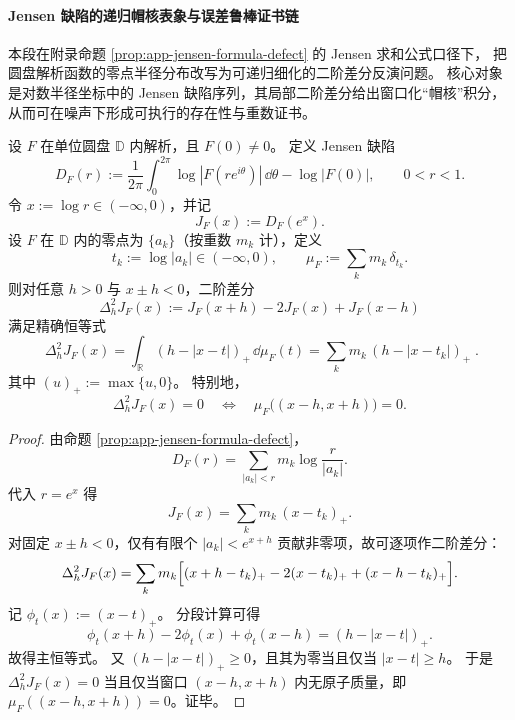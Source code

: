 \paragraph{Jensen 缺陷的递归帽核表象与误差鲁棒证书链}
本段在附录命题 \ref{prop:app-jensen-formula-defect} 的 Jensen 求和公式口径下，
把圆盘解析函数的零点半径分布改写为可递归细化的二阶差分反演问题。
核心对象是对数半径坐标中的 Jensen 缺陷序列，其局部二阶差分给出窗口化“帽核”积分，从而可在噪声下形成可执行的存在性与重数证书。

\begin{theorem}\label{thm:xi-jensen-defect-hat-kernel-second-difference}
设 \(F\) 在单位圆盘 \(\mathbb D\) 内解析，且 \(F(0)\neq 0\)。
定义 Jensen 缺陷
\[
D_F(r):=\frac{1}{2\pi}\int_0^{2\pi}\log|F(re^{i\theta})|\,\dd\theta-\log|F(0)|,
\qquad 0<r<1.
\]
令 \(x:=\log r\in(-\infty,0)\)，并记
\[
J_F(x):=D_F(e^x).
\]
设 \(F\) 在 \(\mathbb D\) 内的零点为 \(\{a_k\}\)（按重数 \(m_k\) 计），定义
\[
t_k:=\log|a_k|\in(-\infty,0),
\qquad
\mu_F:=\sum_k m_k\,\delta_{t_k}.
\]
则对任意 \(h>0\) 与 \(x\pm h<0\)，二阶差分
\[
\Delta_h^2J_F(x):=J_F(x+h)-2J_F(x)+J_F(x-h)
\]
满足精确恒等式
\[
\boxed{\;
\Delta_h^2J_F(x)=\int_{\mathbb R}(h-|x-t|)_+\,\dd\mu_F(t)
=\sum_k m_k\,(h-|x-t_k|)_+\; }.
\]
其中 \((u)_+:=\max\{u,0\}\)。
特别地，
\[
\Delta_h^2J_F(x)=0
\quad\Longleftrightarrow\quad
\mu_F\bigl((x-h,x+h)\bigr)=0.
\]
\end{theorem}
\begin{proof}
由命题 \ref{prop:app-jensen-formula-defect}，
\[
D_F(r)=\sum_{|a_k|<r}m_k\log\frac{r}{|a_k|}.
\]
代入 \(r=e^x\) 得
\[
J_F(x)=\sum_k m_k\,(x-t_k)_+.
\]
对固定 \(x\pm h<0\)，仅有有限个 \(|a_k|<e^{x+h}\) 贡献非零项，故可逐项作二阶差分：
\[
\Delta_h^2J_F(x)
=\sum_k m_k\Bigl[(x+h-t_k)_+-2(x-t_k)_++(x-h-t_k)_+\Bigr].
\]
记 \(\phi_t(x):=(x-t)_+\)。
分段计算可得
\[
\phi_t(x+h)-2\phi_t(x)+\phi_t(x-h)=(h-|x-t|)_+.
\]
故得主恒等式。
又 \((h-|x-t|)_+\ge 0\)，且其为零当且仅当 \(|x-t|\ge h\)。
于是 \(\Delta_h^2J_F(x)=0\) 当且仅当窗口 \((x-h,x+h)\) 内无原子质量，即
\(\mu_F((x-h,x+h))=0\)。证毕。
\end{proof}

